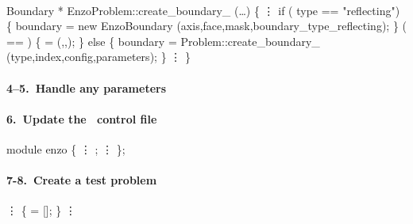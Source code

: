 \begin{frame}[fragile] 
\secframetitle{\ssDevelBoundary}
\framesubtitle{}

\footnotesize
\begin{semiverbatim}
   Boundary * EnzoProblem::create_boundary_ (\dots)
   \{
         \vdots
   if (       type == "reflecting") \{ 
      boundary = new EnzoBoundary 
         (axis,face,mask,boundary_type_reflecting);
   \}  ( == ) \{
       =   (,,);
   \} else \{
      boundary = Problem::create_boundary_
         (type,index,config,parameters);
   \}
         \vdots
   \}
\end{semiverbatim}

\end{frame}


\begin{frame}[fragile] 
\secframetitle{\ssDevelBoundary}
\framesubtitle{4--5.~Handle any parameters}
\end{frame}


\begin{frame}[fragile] 
\secframetitle{\ssDevelBoundary}
\framesubtitle{6.~Update the \charm\ control file }

\footnotesize
\begin{semiverbatim}
   module enzo \{
       \vdots
       ;
       \vdots
   \};
\end{semiverbatim}
\end{frame}



\begin{frame}[fragile] 
\secframetitle{\ssDevelBoundary}
\framesubtitle{7-8.~Create a  test problem}
\vspace{-0.15in}
\begin{semiverbatim}
      \vdots
    \{
       = []; 
   \}
      \vdots
\end{semiverbatim}

\end{frame}


